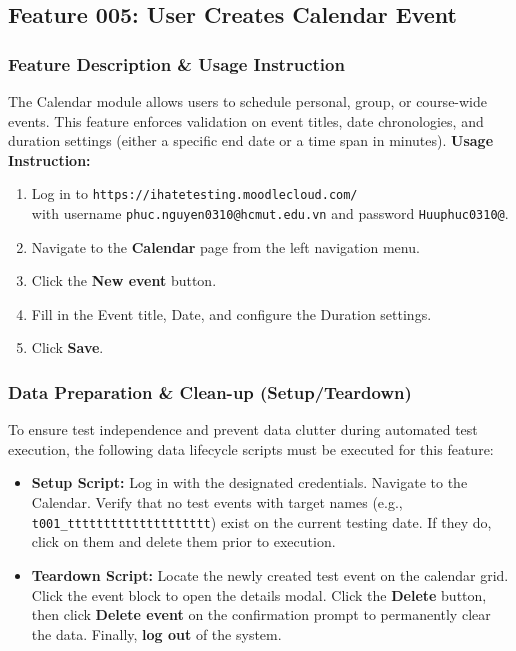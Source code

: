 \documentclass[twoside,final]{hcmut-report}
\begin{document}
\subsection{Feature 005: User Creates Calendar Event}

\subsubsection{Feature Description \& Usage Instruction}
The Calendar module allows users to schedule personal, group, or course-wide events. This feature enforces validation on event titles, date chronologies, and duration settings (either a specific end date or a time span in minutes).
\newline
\textbf{Usage Instruction:}
\begin{enumerate}
    \item Log in to \texttt{https://ihatetesting.moodlecloud.com/}\\ with username \texttt{phuc.nguyen0310@hcmut.edu.vn} and password \texttt{Huuphuc0310@}.
    \item Navigate to the \textbf{Calendar} page from the left navigation menu.
    \item Click the \textbf{New event} button.
    \item Fill in the Event title, Date, and configure the Duration settings.
    \item Click \textbf{Save}.
\end{enumerate}

\subsubsection{Data Preparation \& Clean-up (Setup/Teardown)}
To ensure test independence and prevent data clutter during automated test execution, the following data lifecycle scripts must be executed for this feature:
\begin{itemize}
    \item \textbf{Setup Script:} Log in with the designated credentials. Navigate to the Calendar. Verify that no test events with target names (e.g., \texttt{t001\_tttttttttttttttttttt}) exist on the current testing date. If they do, click on them and delete them prior to execution.
    \item \textbf{Teardown Script:} Locate the newly created test event on the calendar grid. Click the event block to open the details modal. Click the \textbf{Delete} button, then click \textbf{Delete event} on the confirmation prompt to permanently clear the data. Finally, \textbf{log out} of the system.
\end{itemize}
\end{document}
